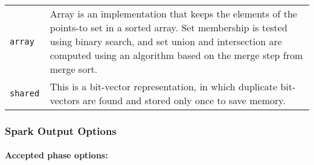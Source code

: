 \documentclass{article}
\begin{document}
\begin{description}
\begin{longtable}{p{1in}p{4in}}
{\tt array }
&

Array is an implementation that keeps the elements of the
points-to set in a sorted array. Set membership is tested using
binary search, and set union and intersection are computed using
an algorithm based on the merge step from merge sort.
\\

{\tt shared }
&
This is a bit-vector representation, in which duplicate bit-vectors are found and stored only once to save memory.\\

\end{longtable}


\end{description}

\subsubsection{Spark Output Options}


\paragraph{Accepted phase options:} 
\end{document}
